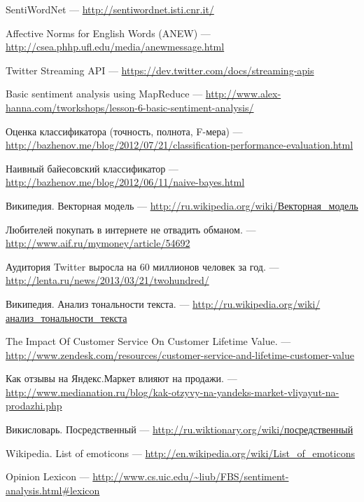 SentiWordNet --- \url{http://sentiwordnet.isti.cnr.it/}

Affective Norms for English Words (ANEW) --- \url{http://csea.phhp.ufl.edu/media/anewmessage.html}

Twitter Streaming API --- \url{https://dev.twitter.com/docs/streaming-apis}

Basic sentiment analysis using MapReduce --- \url{http://www.alex-hanna.com/tworkshops/lesson-6-basic-sentiment-analysis/}

Оценка классификатора (точность, полнота, F-мера) --- \url{http://bazhenov.me/blog/2012/07/21/classification-performance-evaluation.html}

Наивный байесовский классификатор --- \url{http://bazhenov.me/blog/2012/06/11/naive-bayes.html}

Википедия. Векторная модель --- \href{http://ru.wikipedia.org/wiki/%D0%92%D0%B5%D0%BA%D1%82%D0%BE%D1%80%D0%BD%D0%B0%D1%8F_%D0%BC%D0%BE%D0%B4%D0%B5%D0%BB%D1%8C}{http://ru.wikipedia.org/wiki/Векторная\_модель}

Любителей покупать в интернете не отвадить обманом. --- \url{http://www.aif.ru/mymoney/article/54692}

Аудитория Twitter выросла на 60 миллионов человек за год. --- \url{http://lenta.ru/news/2013/03/21/twohundred/}

Википедия. Анализ тональности текста. --- \href{http://ru.wikipedia.org/wiki/%D0%90%D0%BD%D0%B0%D0%BB%D0%B8%D0%B7_%D1%82%D0%BE%D0%BD%D0%B0%D0%BB%D1%8C%D0%BD%D0%BE%D1%81%D1%82%D0%B8_%D1%82%D0%B5%D0%BA%D1%81%D1%82%D0%B0}{http://ru.wikipedia.org/wiki/анализ\_тональности\_текста}

The Impact Of Customer Service On Customer Lifetime Value. --- \url{http://www.zendesk.com/resources/customer-service-and-lifetime-customer-value}

Как отзывы на Яндекс.Маркет влияют на продажи. --- \url{http://www.medianation.ru/blog/kak-otzyvy-na-yandeks-market-vliyayut-na-prodazhi.php}

Викисловарь. Посредственный --- \href{http://ru.wiktionary.org/wiki/%D0%BF%D0%BE%D1%81%D1%80%D0%B5%D0%B4%D1%81%D1%82%D0%B2%D0%B5%D0%BD%D0%BD%D1%8B%D0%B9}{http://ru.wiktionary.org/wiki/посредственный}

Wikipedia. List of emoticons --- \url{http://en.wikipedia.org/wiki/List_of_emoticons}

Opinion Lexicon --- \url{http://www.cs.uic.edu/~liub/FBS/sentiment-analysis.html#lexicon}

